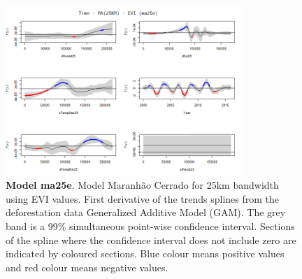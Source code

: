 \begin{table}
\begin{figure}[H]
 \centering
        \centering
        \includegraphics[width=0.8\textwidth]{ma25e.png} %
        \caption[Model Cerrado Maranhão for 25km bandwidth using EVI values. First derivative of the trends splines from the deforestation data Generalized Additive Model (GAM)]{\textbf{Model ma25e}. Model Maranhão Cerrado for 25km bandwidth using EVI values. First derivative of the trends splines from the deforestation data Generalized Additive Model (GAM). The grey band is a 99\% simultaneous point-wise confidence interval. Sections of the spline where the confidence interval does not include zero are indicated by coloured sections. Blue colour means positive values and red colour means negative values.}
\end{figure}
\end{table}

